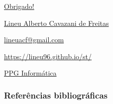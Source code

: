 \documentclass[10pt,
  aspectratio=169,
  serif,
  mathserif,
  professionalfont,
  compress,
  handout,
  ]{beamer}\usepackage[]{graphicx}\usepackage[]{color}
\begin{document}

\begin{frame}[c, allowframebreaks]

\begin{center}

  {\huge \href{https://lineu96.github.io/st/}{Obrigado!}}
  
  \vspace{0.5cm}
    
  {\normalsize \href{https://lineu96.github.io/st/}{Lineu Alberto Cavazani de Freitas}}
  
  {\normalsize \href{https://lineu96.github.io/st/}{lineuacf@gmail.com}}
  
  {\normalsize \href{https://lineu96.github.io/st/}{https://lineu96.github.io/st/}}
  
  {\normalsize \href{http://www.prppg.ufpr.br/ppginformatica/?lang=pb}{PPG Informática}}


\begin{figure} %
\end{figure} %

\end{center}

\end{frame}


\begin{frame}[fragile]
  \frametitle{Referências bibliográficas}
  
  \begin{tiny}
    
  \end{tiny}
  
\end{frame}
\end{document}
